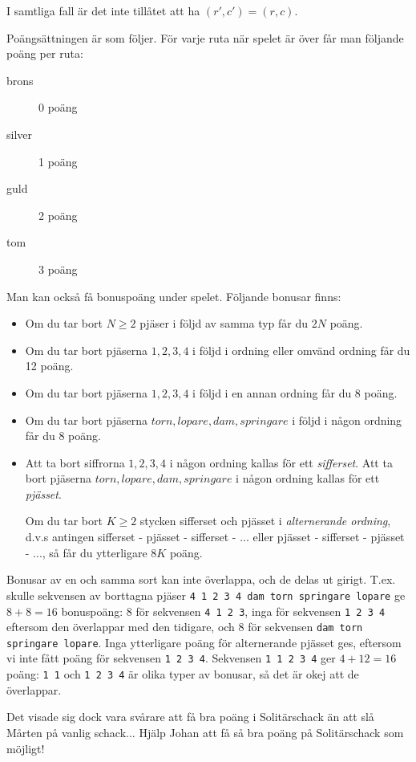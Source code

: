 I samtliga fall är det inte tillåtet att ha $(r', c') = (r, c)$.

Poängsättningen är som följer. För varje ruta när spelet är över får man följande poäng per ruta:
\begin{description}
  \item[brons] 0 poäng
  \item[silver] 1 poäng
  \item[guld] 2 poäng
  \item[tom] 3 poäng
\end{description}

Man kan också få bonuspoäng under spelet. Följande bonusar finns:
\begin{itemize}
  \item Om du tar bort $N \ge 2$ pjäser i följd av samma typ får du $2N$ poäng.
  \item Om du tar bort pjäserna $1, 2, 3, 4$ i följd i ordning eller omvänd ordning får du 12 poäng.
  \item Om du tar bort pjäserna $1, 2, 3, 4$ i följd i en annan ordning får du 8 poäng.
  \item Om du tar bort pjäserna $torn, lopare, dam, springare$ i följd i någon ordning får du 8 poäng.
  \item Att ta bort siffrorna $1, 2, 3, 4$ i någon ordning kallas för ett \emph{sifferset}.
    Att ta bort pjäserna $torn, lopare, dam, springare$ i någon ordning kallas för ett \emph{pjässet}.

    Om du tar bort $K \ge 2$ stycken sifferset och pjässet i \emph{alternerande ordning}, d.v.s antingen
    sifferset - pjässet - sifferset - ... eller pjässet - sifferset - pjässet - ..., så får du
    ytterligare $8K$ poäng.
\end{itemize}

Bonusar av en och samma sort kan inte överlappa, och de delas ut girigt.
T.ex. skulle sekvensen av borttagna pjäser \texttt{4 1 2 3 4 dam torn springare lopare} ge $8 + 8 = 16$ bonuspoäng:
8 för sekvensen \texttt{4 1 2 3},
inga för sekvensen \texttt{1 2 3 4} eftersom den överlappar med den tidigare,
och 8 för sekvensen \texttt{dam torn springare lopare}.
Inga ytterligare poäng för alternerande pjässet ges, eftersom vi inte fått poäng för sekvensen \texttt{1 2 3 4}.
Sekvensen \texttt{1 1 2 3 4} ger $4 + 12 = 16$ poäng: \texttt{1 1} och \texttt{1 2 3 4} är olika typer av bonusar, så det är okej att de överlappar.

Det visade sig dock vara svårare att få bra poäng i Solitärschack än att slå Mårten på vanlig schack... Hjälp Johan att få så
bra poäng på Solitärschack som möjligt!

